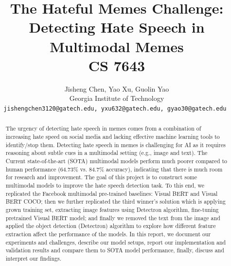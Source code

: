 \documentclass[10pt,twocolumn,letterpaper]{article}
\begin{document}
\title{The Hateful Memes Challenge: Detecting Hate Speech in Multimodal Memes\\  CS 7643}

\author{Jisheng Chen, Yao Xu, Guolin Yao\\
Georgia Institute of Technology\\
{\tt\small jishengchen3120@gatech.edu, yxu632@gatech.edu, gyao30@gatech.edu }
}

\maketitle

\begin{abstract}
  The urgency of detecting hate speech in memes comes from a combination of increasing hate speed on social media and lacking effective machine learning tools to identify/stop them. Detecting hate speech in memes is challenging for AI as it requires reasoning about subtle cues in a multimodal setting (e.g., image and text). The Current state-of-the-art (SOTA) multimodal models perform much poorer compared to human performance (64.73\% vs. 84.7\% accuracy), indicating that there is much room for research and improvement. The goal of this project is to construct some multimodal models to improve the hate speech detection task. To this end, we replicated the Facebook multimodal pre-trained baselines: Visual BERT and Visual BERT COCO; then we further replicated the third winner’s solution which is applying grown training set, extracting image features using Detectron algorithm, fine-tuning pretrained Visual BERT model; and finally we removed the text from the image and applied the object detection (Detectron) algorithm to explore how different feature extraction affect the performance of the models. In this report, we document our experiments and challenges, describe our model setups, report our implementation and validation results and compare them to SOTA model performance, finally, discuss and interpret our findings.
\end{abstract}
\end{document}
